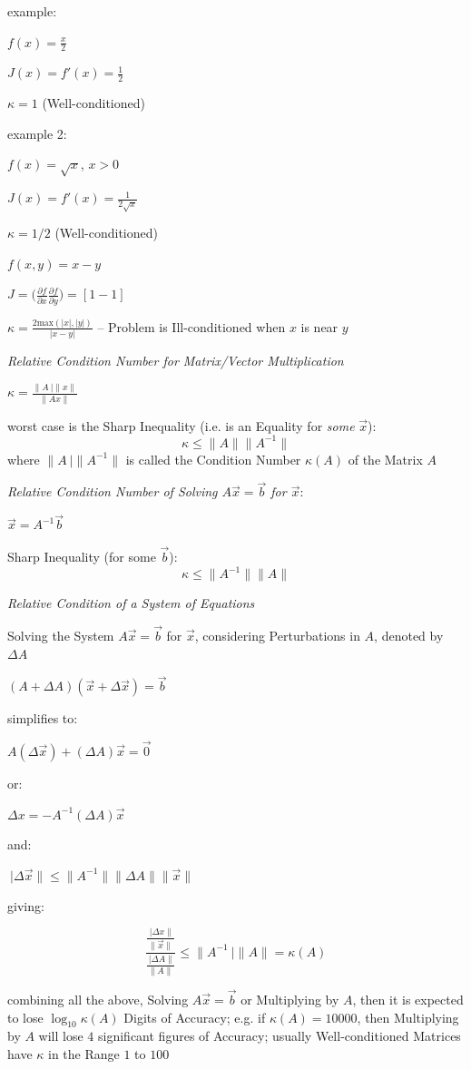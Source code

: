 {example:

$f(x) = \frac{x}{2}$

$J(x) = f'(x) = \frac{1}{2}$

$\kappa = 1$ (Well-conditioned)

example 2:

$f(x) = \sqrt x$, $x > 0$

$J(x) = f'(x) = \frac{1}{2\sqrt{x}}$

$\kappa = 1/2$ (Well-conditioned)

$f(x,y) = x - y$

$J = \Big(
  \frac{\partial{f}}{\partial{x}}
  \frac{\partial{f}}{\partial{y}}
\Big) = [1 -1]$

$\kappa = \frac{2 \mathrm{max}(|x|,|y|)}{|x - y|}$ --
Problem is Ill-conditioned when $x$ is near $y$


\emph{Relative Condition Number for Matrix/Vector Multiplication}

$\kappa = \frac{\|A\ |\|x\|}{\|Ax\|}$

worst case is the Sharp Inequality (i.e. is an Equality for \emph{some}
$\vec{x}$):
\[
  \kappa \leq \|A\| \|A^{-1}\|
\]
where $\|A\ |\|A^{-1}\|$ is called the Condition Number $\kappa(A)$ of the
Matrix $A$


\emph{Relative Condition Number of Solving $A\vec{x} = \vec{b}$ for $\vec{x}$}:

$\vec{x} = A^{-1}\vec{b}$

Sharp Inequality (for some $\vec{b}$):
\[
  \kappa \leq \|A^{-1}\| \|A\|
\]


\emph{Relative Condition of a System of Equations}

Solving the System $A\vec{x} = \vec{b}$ for $\vec{x}$, considering
Perturbations in $A$, denoted by $\Delta A$

$(A + \Delta A)(\vec{x} + \Delta\vec{x}) = \vec{b}$

simplifies to:

$A(\Delta\vec{x}) + (\Delta A)\vec{x} = \vec{0}$

or:

$\Delta x = -A^{-1}(\Delta A)\vec{x}$

and:

$\ |\Delta\vec{x}\| \leq \|A^{-1}\| \|\Delta{A}\| \|\vec{x}\|$

giving:

\[
  \frac{
    \frac{\ |\Delta{x}\|}{\|\vec{x}\|}
  }{
    \frac{\ |\Delta{A}\|}{\|A\|}
  }
  \leq \|A^{-1}\ |\|A\| = \kappa(A)
\]

combining all the above, Solving $A\vec{x} = \vec{b}$ or Multiplying by $A$,
then it is expected to lose $\log_{10} \kappa(A)$ Digits of Accuracy; e.g. if
$\kappa(A) = 10000$, then Multiplying by $A$ will lose $4$ significant figures
of Accuracy; usually Well-conditioned Matrices have $\kappa$ in the Range $1$
to $100$



}
